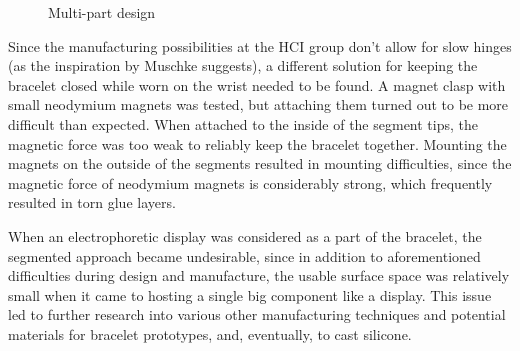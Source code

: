 \begin{figure}[bth]
	\myfloatalign
	 \quad
	\caption{Multi-part design}
\end{figure}

Since the manufacturing possibilities at the \ac{HCI} group don't allow for slow hinges (as the inspiration by Muschke suggests), a different solution for keeping the bracelet closed while worn on the wrist needed to be found. A magnet clasp with small neodymium magnets was tested, but attaching them turned out to be more difficult than expected. When attached to the inside of the segment tips, the magnetic force was too weak to reliably keep the bracelet together. Mounting the magnets on the outside of the segments resulted in mounting difficulties, since the magnetic force of neodymium magnets is considerably strong,  which frequently resulted in torn glue layers.

When an electrophoretic display was considered as a part of the bracelet, the segmented approach became undesirable, since in addition to aforementioned difficulties during design and manufacture, the usable surface space was relatively small when it came to hosting a single big component like a display. This issue led to further research into various other manufacturing techniques and potential materials for bracelet prototypes, and, eventually, to cast silicone.

